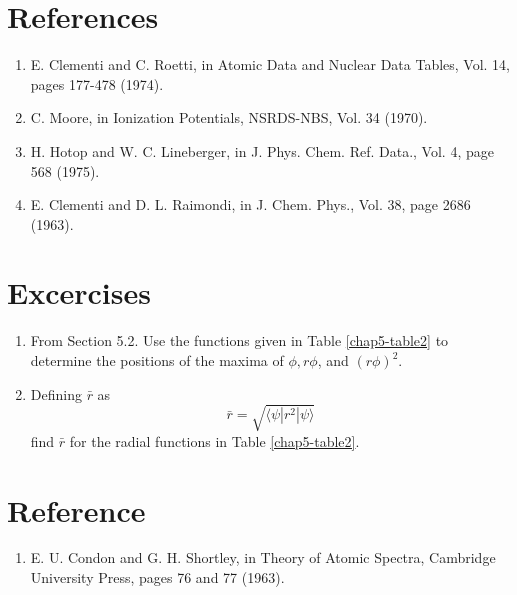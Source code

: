 \section{References}
\begin{enumerate}
\item E. Clementi and C. Roetti, in Atomic Data and Nuclear Data 
Tables, Vol. 14, pages 177-478 (1974).

\item C. Moore, in Ionization Potentials, NSRDS-NBS, Vol. 34 
(1970).

\item H. Hotop and W. C. Lineberger, in J. Phys. Chem. Ref. 
Data., Vol. 4, page 568 (1975).

\item E. Clementi and D. L. Raimondi, in J. Chem. Phys., Vol. 38, 
page 2686 (1963).
\end{enumerate}

\section{Excercises}
\begin{enumerate}
\item From Section 5.2.  Use the functions given in Table \ref{chap5-table2} to 
determine the positions of the maxima of $\phi , r \phi$, and $(r
\phi)^2$.

\item Defining ${\bar r}$ as
\begin{equation}
{\bar r} = \sqrt{\langle \psi | r^2 | \psi \rangle}
\end{equation}
find ${\bar r}$ for the radial functions in Table \ref{chap5-table2}.
\end{enumerate}


\section{Reference}
\begin{enumerate}
\item  E. U. Condon and G. H. Shortley, in Theory of Atomic 
Spectra, Cambridge University Press, pages 76 and 77 (1963).
\end{enumerate}


